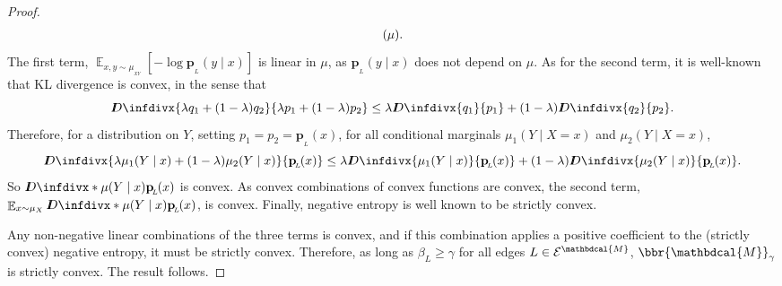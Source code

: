 \documentclass[letterpaper]{article} %
\theoremstyle{plain}
\theoremstyle{definition}
\theoremstyle{remark}
\newcommand{\thickD}{I\mkern-8muD}
\newcommand{\kldiv}{\thickD\infdivx}
\let\H\relax
\DeclareMathOperator{\H}{\mathrm{H}} %
\DeclareMathOperator*{\E}{\mathbb{E}} %
\newcommand\mat[1]{\mathbf{#1}}
\newcommand{\bp}[1][L]{\mat{p}_{\!_{#1}\!}}
\newcommand{\Ed}{\mathcal E}
\newcommand{\dg}[1]{\mathbdcal{#1}}
\begin{document}
\begin{proof}
\begin{align*}
                                \H(\mu). 
	\end{align*}
	The first term, 
	\( \E_{x,y \sim \mu_{\!_{XY}}} \left[-\log {\bp(y\mid x)}\right] \) 
	is linear in $\mu$, as $\bp(y\mid x)$ does not depend on $\mu$. %
As for the second term, it is well-known that KL divergence is convex, in the sense that 
	\[ \kldiv{\lambda q_1 + (1-\lambda) q_2 }{ \lambda p_1 +
          (1-\lambda) p_2} \leq \lambda \kldiv {q_1}{ p_1} +
                (1-\lambda) \kldiv{q_2}{p_2}. \] 
	Therefore, for a distribution on $Y$, setting $p_1 =
 p_2 = \bp(x)$, for all conditional marginals $\mu_1(Y \mid X=x)$ and
			$\mu_2(Y\mid X=x)$,
	\[ \kldiv{\lambda \mu_1(Y\mid x) + (1-\lambda)
			  \mu_2(Y\mid x) }{ \bp(x) } \leq \lambda \kldiv
			   {\mu_1(Y\mid x)}{\bp(x)} + (1-\lambda)
								  \kldiv{\mu_2(Y\mid x)}{\bp(x)}. \] 
	So $\kldiv*{\mu(Y\mid x)}{\bp( x)}$ is convex. As
			convex combinations of convex functions are convex,
			the second term, $\E_{x\sim\mu_X}\kldiv*{\mu(Y\mid
			  x)}{\bp( x)}$, is convex.
Finally, negative entropy is well known to be strictly convex.                

			Any non-negative linear combinations of the three
			terms is convex, and if this combination applies a
			positive coefficient to the (strictly convex) negative entropy,
			it must be strictly convex. Therefore, as
			long as $\beta_L \geq \gamma$ for all edges $L \in
			\Ed^{\dg M}$, $\bbr{\dg M}_\gamma$ is
strictly convex.  The result follows.
\end{proof}
\end{document}
